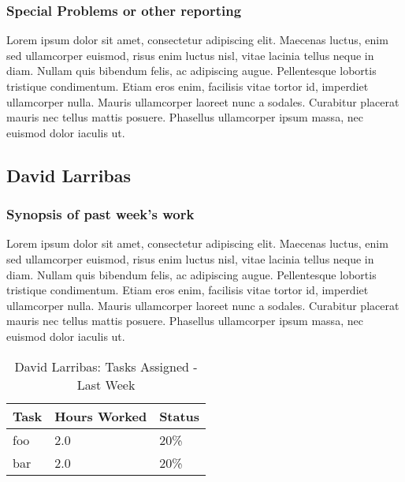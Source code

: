 \documentclass[12pt,article,compsoc]{IEEEtran}
\begin{document}
	\subsubsection*{Special Problems or other reporting}
	Lorem ipsum dolor sit amet, consectetur adipiscing elit. Maecenas luctus, enim sed ullamcorper euismod, risus enim luctus nisl, vitae lacinia tellus neque in diam. Nullam quis bibendum felis, ac adipiscing augue. Pellentesque lobortis tristique condimentum. Etiam eros enim, facilisis vitae tortor id, imperdiet ullamcorper nulla. Mauris ullamcorper laoreet nunc a sodales. Curabitur placerat mauris nec tellus mattis posuere. Phasellus ullamcorper ipsum massa, nec euismod dolor iaculis ut.

\subsection{David Larribas}

	\subsubsection*{Synopsis of past week's work}

	Lorem ipsum dolor sit amet, consectetur adipiscing elit. Maecenas luctus, enim sed ullamcorper euismod, risus enim luctus nisl, vitae lacinia tellus neque in diam. Nullam quis bibendum felis, ac adipiscing augue. Pellentesque lobortis tristique condimentum. Etiam eros enim, facilisis vitae tortor id, imperdiet ullamcorper nulla. Mauris ullamcorper laoreet nunc a sodales. Curabitur placerat mauris nec tellus mattis posuere. Phasellus ullamcorper ipsum massa, nec euismod dolor iaculis ut.

	\begin{table}[ht]
	\renewcommand{\arraystretch}{1.3}
		\caption{David Larribas: Tasks Assigned - Last Week}
		
		\label{Summary of David Larribas' activities: last week}
		
		\centering
		\begin{tabular}{p{5.5cm}|p{1cm}|p{1cm}}
		\hline
		\bfseries 	Task		 		& \bfseries Hours Worked	& \bfseries Status	\\
		\hline\hline
					foo					& 2.0						& 20\%				\\	%
					bar					& 2.0						& 20\%				\\	
		\hline
		\end{tabular}
	\end{table}
\end{document}
